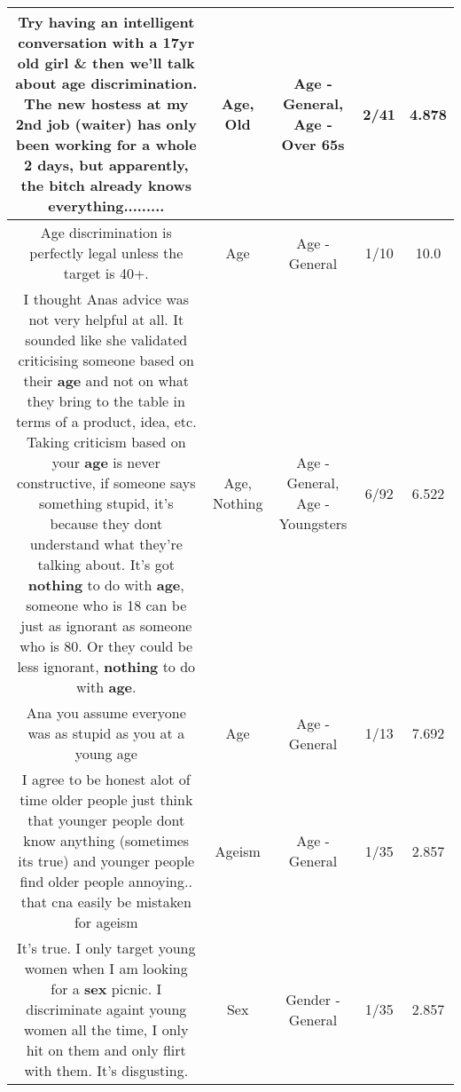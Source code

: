 \documentclass[11pt]{article}
\newlength\mylength
\begin{document}
\begin{center}
\begin{longtable}{|C{.65\mylength}|C{.30\mylength}|C{.12\mylength}|C{.12\mylength}|C{.12\mylength}|}
  \small Try having an intelligent conversation with a 17yr \textbf{old} girl \& then we'll talk about \textbf{age} discrimination. The new hostess at my 2nd job (waiter) has only been working for a whole 2 days, but apparently, the bitch already knows everything.........\normalsize   & Age, Old & Age - General, Age - Over 65s & 2/41 & 4.878 \\  \hline
  \small Age discrimination is perfectly legal unless the target is 40+.\normalsize   & Age & Age - General & 1/10 & 10.0 \\  \hline
  \small I thought Anas advice was not very helpful at all. It sounded like she validated criticising someone based on their \textbf{age} and not on what they bring to the table in terms of a product, idea, etc. Taking criticism based on your \textbf{age} is never constructive, if someone says something stupid, it's because they dont understand what they're talking about. It's got \textbf{nothing} to do with \textbf{age}, someone who is 18 can be just as ignorant as someone who is 80. Or they could be less ignorant, \textbf{nothing} to do with \textbf{age}.\normalsize   & Age, Nothing & Age - General, Age - Youngsters & 6/92 & 6.522 \\  \hline
  \small Ana you assume everyone was as stupid as you at a young age\normalsize   & Age & Age - General & 1/13 & 7.692 \\  \hline
  \small I agree to be honest alot of time older people just think that younger people dont know anything (sometimes its true) and younger people find older people annoying.. that cna easily be mistaken for ageism\normalsize   & Ageism & Age - General & 1/35 & 2.857 \\  \hline
  \small It's true. I only target young women when I am looking for a \textbf{sex} picnic. I discriminate againt young women all the time, I only hit on them and only flirt with them. It's disgusting.\normalsize   & Sex & Gender - General & 1/35 & 2.857 \\  \hline
  
\end{longtable}
\end{center}
\end{document}
